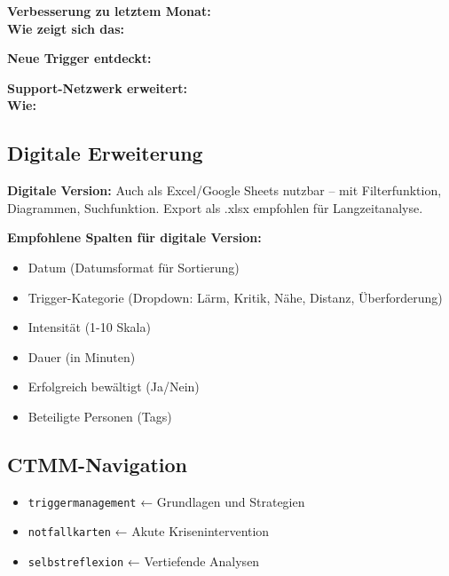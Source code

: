 \textbf{Verbesserung zu letztem Monat:}\\
 \quad \textbf{Wie zeigt sich das:} 

\textbf{Neue Trigger entdeckt:}\\

\textbf{Support-Netzwerk erweitert:}\\
 \quad \textbf{Wie:} 

\subsection*{\textcolor{ctmmBlue}{Digitale Erweiterung}}

\begin{ctmmBlueBox}[title=Tipp für digitale Nutzung]
\textbf{Digitale Version:} Auch als Excel/Google Sheets nutzbar -- mit Filterfunktion, Diagrammen, Suchfunktion. Export als .xlsx empfohlen für Langzeitanalyse.

\textbf{Empfohlene Spalten für digitale Version:}
\begin{itemize}
  \item Datum (Datumsformat für Sortierung)
  \item Trigger-Kategorie (Dropdown: Lärm, Kritik, Nähe, Distanz, Überforderung)
  \item Intensität (1-10 Skala)
  \item Dauer (in Minuten)  
  \item Erfolgreich bewältigt (Ja/Nein)
  \item Beteiligte Personen (Tags)
\end{itemize}
\end{ctmmBlueBox}

\subsection*{\textcolor{ctmmBlue}{CTMM-Navigation}}
\begin{itemize}
  \item \texttt{triggermanagement} ← Grundlagen und Strategien
  \item \texttt{notfallkarten} ← Akute Krisenintervention
  \item \texttt{selbstreflexion} ← Vertiefende Analysen
\end{itemize}
